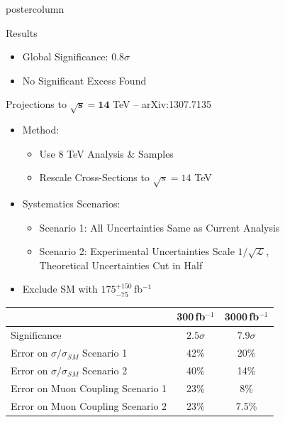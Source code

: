 \documentclass[final,hyperref={pdfpagelabels=false}]{beamer}
\newcommand{\fb}{\,fb$^{-1}$}
\begin{document}
\begin{frame}
\begin{columns}
\begin{column}{.49\textwidth}
\begin{beamercolorbox}[center,wd=\textwidth]{postercolumn}
\begin{minipage}[T]{.95\textwidth}
{\begin{block}{Results}
\begin{itemize}
                \item Global Significance: $0.8\sigma$
                \item No Significant Excess Found
              \end{itemize}
            \end{block}
            \vfill
            \begin{block}{\boldmath Projections to $\mathbf{\sqrt{s}=14}$ TeV -- arXiv:1307.7135 }
               \begin{itemize} 
                  \item Method:
                  \begin{itemize} 
                    \item Use 8 TeV Analysis \& Samples 
                    \item Rescale Cross-Sections to $\sqrt{s}=14$ TeV
                  \end{itemize}
                  \item Systematics Scenarios:
                  \begin{itemize}
                    \item Scenario 1: All Uncertainties Same as Current Analysis
                    \item Scenario 2: Experimental Uncertainties Scale $1/\sqrt{\mathcal{L}}$, \\
                                      Theoretical Uncertainties Cut in Half
                  \end{itemize}
                  \item Exclude SM with $175^{+150}_{-75}$\fb
               \end{itemize}
               \begin{center}
                      \begin{tabular}{|l|c|c|} \hline
                          & 300\fb & 3000\fb \\ \hline
                        Significance  & $2.5\sigma$ & $7.9\sigma$ \\ \hline
                        Error on $\sigma/\sigma_{SM}$ Scenario 1  & 42\% & 20\% \\ \hline
                        Error on $\sigma/\sigma_{SM}$ Scenario 2  & 40\% & 14\% \\ \hline
                        Error on Muon Coupling Scenario 1  & 23\% & 8\% \\ \hline
                        Error on Muon Coupling Scenario 2  & 23\% & 7.5\% \\ \hline

\end{tabular}
\end{center}
\end{block}}
\end{minipage}
\end{beamercolorbox}
\end{column}
\end{columns}
\end{frame}
\end{document}
